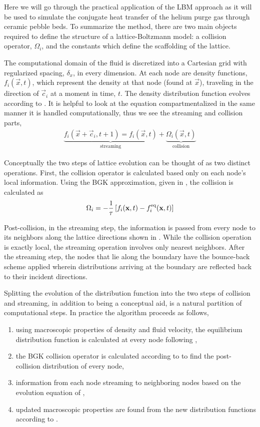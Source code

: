 Here we will go through the practical application of the LBM approach as it will be used  to simulate the conjugate heat transfer of the helium purge gas through ceramic pebble beds. To summarize the method, there are two main objects required to define the structure of a lattice-Boltzmann model: a collision operator, $\Omega_i$, and the constants which define the scaffolding of the lattice.

The computational domain of the fluid is discretized into a Cartesian grid with regularized spacing, $\delta_x$, in every dimension. At each node are density functions, $f_i(\vec{x},t)$, which represent the density at that node (found at $\vec{x}$), traveling in the direction of $\vec{c}_i$ at a moment in time, $t$. The density distribution function evolves according to . It is helpful to look at the equation compartmentalized in the same manner it is handled computationally, thus we see the streaming and collision parts,
\begin{align}
	\underbrace{f_i(\vec{x}+\vec{c}_i, t + 1)  = f_i(\vec{x},t)}_\text{streaming}  + \underbrace{\Omega_i(\vec{x},t)}_\text{collision}
\end{align}

Conceptually the two steps of lattice evolution can be thought of as two distinct operations. First, the collision operator is calculated based only on each node's local information. Using the BGK approximation, given in , the collision is calculated as
\begin{align}
	\Omega_i = -\frac{1}{\tau}\left[f_i(\mathbf{x},t) - f_i^{\text{eq}}(\mathbf{x},t)\right]
\end{align}

Post-collision, in the streaming step, the information is passed from every node to its neighbors along the lattice directions shown in . While the collision operation is exactly local, the streaming operation involves only nearest neighbors. After the streaming step, the nodes that lie along the boundary have the bounce-back scheme applied wherein distributions arriving at the boundary are reflected back to their incident directions.

Splitting the evolution of the distribution function into the two steps of collision and streaming, in addition to being a conceptual aid, is a natural partition of computational steps. In practice the algorithm proceeds as follows,\cite{Viggen2009}
\begin{enumerate}
	\item{using macroscopic properties of density and fluid velocity, the equilibrium distribution function is calculated at every node following ,}
	\item{the BGK collision operator is calculated according to  to find the post-collision distribution of every node,}
	\item{information from each node streaming to neighboring nodes based on the evolution equation of ,}
	\item{updated macroscopic properties are found from the new distribution functions according to .}
\end{enumerate}

